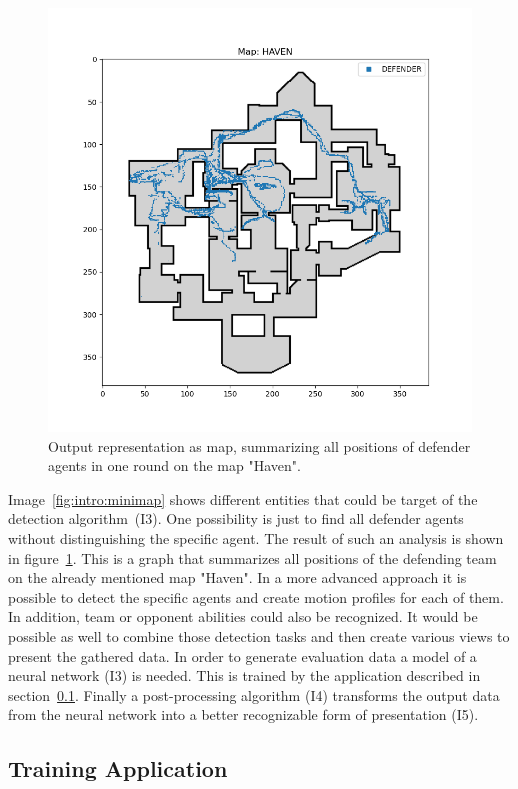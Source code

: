 \begin{figure}
	\centering
	\includegraphics[width=0.8\linewidth]{images/05-output}
	\caption[Output representation as map.]{Output representation as map, summarizing all positions 
	of defender agents in one round on the map "Haven".}
	\label{fig:app:output}
\end{figure}

Image~\ref{fig:intro:minimap} shows different entities that could be target of the detection 
algorithm~(I3). One possibility is just to find all defender agents without distinguishing the specific 
agent. The result of such an analysis is shown in figure~\ref{fig:app:output}. This is a graph that 
summarizes all positions of the defending team on the already mentioned map "Haven". In a more 
advanced approach it is possible to detect the specific agents and create motion profiles for 
each of them. In addition, team or opponent abilities could also be recognized. It would be possible 
as well to combine those detection tasks and then create various views to present the gathered 
data. In order to generate evaluation data a model of a neural network (I3) is needed. This is trained 
by the application described in section~\ref{subsec:app:training}. Finally a post-processing 
algorithm (I4) transforms the output data from the neural network into a better recognizable form of 
presentation (I5).

\subsection{Training Application}\label{subsec:app:training}



